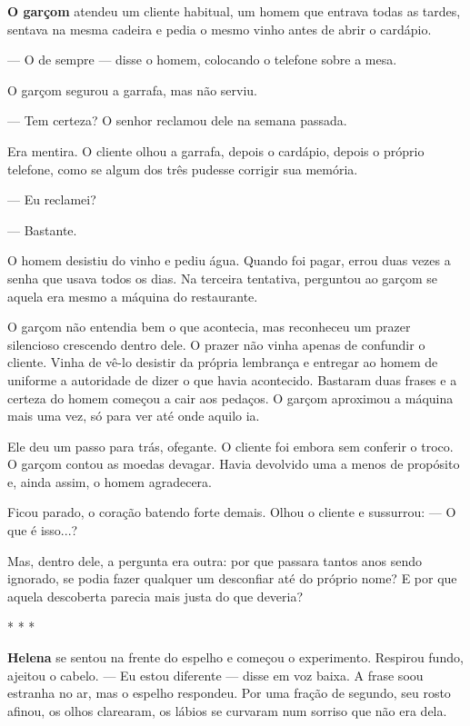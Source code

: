 \textbf{O garçom} atendeu um cliente habitual, um homem que entrava todas as tardes, sentava na mesma cadeira e pedia o mesmo vinho antes de abrir o cardápio.

— O de sempre — disse o homem, colocando o telefone sobre a mesa.

O garçom segurou a garrafa, mas não serviu.

— Tem certeza? O senhor reclamou dele na semana passada.

Era mentira. O cliente olhou a garrafa, depois o cardápio, depois o próprio telefone, como se algum dos três pudesse corrigir sua memória.

— Eu reclamei?

— Bastante.

O homem desistiu do vinho e pediu água. Quando foi pagar, errou duas vezes a senha que usava todos os dias. Na terceira tentativa, perguntou ao garçom se aquela era mesmo a máquina do restaurante.

O garçom não entendia bem o que acontecia, mas reconheceu um prazer silencioso crescendo dentro dele.
O prazer não vinha apenas de confundir o cliente. Vinha de vê-lo desistir da própria lembrança e entregar ao homem de uniforme a autoridade de dizer o que havia acontecido. Bastaram duas frases e a certeza do homem começou a cair aos pedaços. O garçom aproximou a máquina mais uma vez, só para ver até onde aquilo ia.

Ele deu um passo para trás, ofegante.  
O cliente foi embora sem conferir o troco. O garçom contou as moedas devagar. Havia devolvido uma a menos de propósito e, ainda assim, o homem agradecera.

Ficou parado, o coração batendo forte demais.  
Olhou o cliente e sussurrou:  
— O que é isso...?

Mas, dentro dele, a pergunta era outra: por que passara tantos anos sendo ignorado, se podia fazer qualquer um desconfiar até do próprio nome? E por que aquela descoberta parecia mais justa do que deveria?

\begin{center}
* * *
\end{center}

\textbf{Helena} se sentou na frente do espelho e começou o experimento.  
Respirou fundo, ajeitou o cabelo.  
— Eu estou diferente — disse em voz baixa.  
A frase soou estranha no ar, mas o espelho respondeu.  
Por uma fração de segundo, seu rosto afinou, os olhos clarearam, os lábios se curvaram num sorriso que não era dela.  

